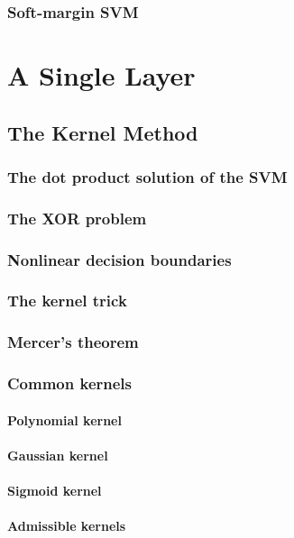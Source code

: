 \documentclass[11pt]{book} %
\begin{document}
\subsection{Soft-margin SVM}

%
%
%
%
%
%
%
%
%
%
%
%
%
%
%
%


\chapter{A Single Layer}

\section{The Kernel Method}
\subsection{The dot product solution of the SVM}
\subsection{The XOR problem}
\subsection{Nonlinear decision boundaries}
\subsection{The kernel trick}
\subsection{Mercer's theorem}
\subsection{Common kernels}
\subsubsection{Polynomial kernel}
\subsubsection{Gaussian kernel}
\subsubsection{Sigmoid kernel}
\subsubsection{Admissible kernels}
\end{document}
